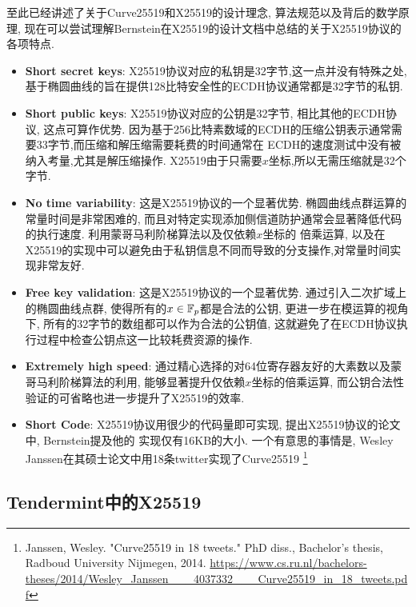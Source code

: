 至此已经讲述了关于Curve25519和X25519的设计理念, 算法规范以及背后的数学原理,
现在可以尝试理解Bernstein在X25519的设计文档中总结的关于X25519协议的各项特点.
\begin{itemize}
\item \textbf{Short secret keys}: X25519协议对应的私钥是32字节,这一点并没有特殊之处,
基于椭圆曲线的旨在提供128比特安全性的ECDH协议通常都是32字节的私钥.
\item \textbf{Short public keys}: X25519协议对应的公钥是32字节, 相比其他的ECDH协议, 这点可算作优势.
因为基于256比特素数域的ECDH的压缩公钥表示通常需要33字节,而压缩和解压缩需要耗费的时间通常在
ECDH的速度测试中没有被纳入考量,尤其是解压缩操作. X25519由于只需要$x$坐标,所以无需压缩就是32个字节.
\item \textbf{No time variability}: 这是X25519协议的一个显著优势. 椭圆曲线点群运算的常量时间是非常困难的,
而且对特定实现添加侧信道防护通常会显著降低代码的执行速度. 利用蒙哥马利阶梯算法以及仅依赖$x$坐标的
倍乘运算, 以及在X25519的实现中可以避免由于私钥信息不同而导致的分支操作,对常量时间实现非常友好.
\item \textbf{Free key validation}: 这是X25519协议的一个显著优势. 通过引入二次扩域上的椭圆曲线点群,
使得所有的$x\in\mathbb{F}_p$都是合法的公钥, 更进一步在模运算的视角下, 所有的32字节的数组都可以作为合法的公钥值,
这就避免了在ECDH协议执行过程中检查公钥点这一比较耗费资源的操作.
\item \textbf{Extremely high speed}: 通过精心选择的对64位寄存器友好的大素数以及蒙哥马利阶梯算法的利用,
能够显著提升仅依赖$x$坐标的倍乘运算, 而公钥合法性验证的可省略也进一步提升了X25519的效率.
\item \textbf{Short Code}: X25519协议用很少的代码量即可实现, 提出X25519协议的论文中, Bernstein提及他的
实现仅有16KB的大小. 一个有意思的事情是, Wesley Janssen在其硕士论文中用18条twitter实现了Curve25519
\footnote{
Janssen, Wesley. "Curve25519 in 18 tweets." PhD diss., Bachelor’s thesis, Radboud University Nijmegen, 2014.
\url{https://www.cs.ru.nl/bachelors-theses/2014/Wesley_Janssen___4037332___Curve25519_in_18_tweets.pdf}}
\end{itemize}

\subsection{Tendermint中的X25519}

